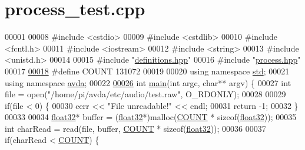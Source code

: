 \hypertarget{process__test_8cpp_source}{\section{process\+\_\+test.\+cpp}
\label{process__test_8cpp_source}
}

\begin{DoxyCode}
00001 
00008 \textcolor{preprocessor}{#include <cstdio>}
00009 \textcolor{preprocessor}{#include <cstdlib>}
00010 \textcolor{preprocessor}{#include <fcntl.h>}
00011 \textcolor{preprocessor}{#include <iostream>}
00012 \textcolor{preprocessor}{#include <string>}
00013 \textcolor{preprocessor}{#include <unistd.h>}
00014 
00015 \textcolor{preprocessor}{#include "\hyperlink{definitions_8hpp}{definitions.hpp}"}
00016 \textcolor{preprocessor}{#include "\hyperlink{process_8hpp}{process.hpp}"}
00017 
\hypertarget{process__test_8cpp_source_l00018}{}\hyperlink{process__test_8cpp_a698c124f1c293f98840449d6c5b9d984}{00018} \textcolor{preprocessor}{#define COUNT 131072}
00019 
00020 \textcolor{keyword}{using namespace }\hyperlink{namespacestd}{std};
00021 \textcolor{keyword}{using namespace }\hyperlink{namespaceavda}{avda};
00022 
\hypertarget{process__test_8cpp_source_l00026}{}\hyperlink{process__test_8cpp_a3c04138a5bfe5d72780bb7e82a18e627}{00026} \textcolor{keywordtype}{int} \hyperlink{process__test_8cpp_a3c04138a5bfe5d72780bb7e82a18e627}{main}(\textcolor{keywordtype}{int} argc, \textcolor{keywordtype}{char}** argv) \{
00027     \textcolor{keywordtype}{int} file = open(\textcolor{stringliteral}{"/home/pi/avda/etc/audio/test.raw"}, O\_RDONLY);
00028 
00029     \textcolor{keywordflow}{if}(file < 0) \{
00030         cerr << \textcolor{stringliteral}{"File unreadable!"} << endl;
00031         \textcolor{keywordflow}{return} -1;
00032     \}
00033 
00034     \hyperlink{definitions_8hpp_aacdc525d6f7bddb3ae95d5c311bd06a1}{float32}* buffer = (\hyperlink{definitions_8hpp_aacdc525d6f7bddb3ae95d5c311bd06a1}{float32}*)malloc(\hyperlink{process__test_8cpp_a698c124f1c293f98840449d6c5b9d984}{COUNT} * \textcolor{keyword}{sizeof}(\hyperlink{definitions_8hpp_aacdc525d6f7bddb3ae95d5c311bd06a1}{float32}));
00035     \textcolor{keywordtype}{int} charRead = read(file, buffer, \hyperlink{process__test_8cpp_a698c124f1c293f98840449d6c5b9d984}{COUNT} * \textcolor{keyword}{sizeof}(\hyperlink{definitions_8hpp_aacdc525d6f7bddb3ae95d5c311bd06a1}{float32}));
00036 
00037     \textcolor{keywordflow}{if}(charRead < \hyperlink{process__test_8cpp_a698c124f1c293f98840449d6c5b9d984}{COUNT}) \{

\end{DoxyCode}

